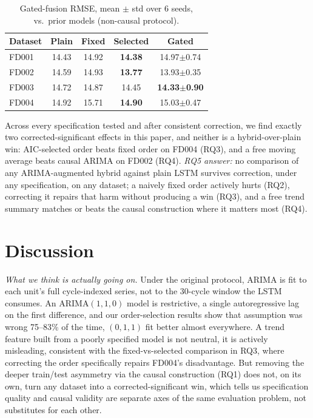 \documentclass[conference]{IEEEtran}
\begin{document}
\begin{table}[t]
\centering
\caption{Gated-fusion RMSE, mean $\pm$ std over 6 seeds, vs.\ prior models (non-causal protocol).}
\label{tab:gated}
\footnotesize
\begin{tabular}{lcccc}
\toprule
Dataset & Plain & Fixed & Selected & Gated \\
\midrule
FD001 & 14.43 & 14.92 & \textbf{14.38} & 14.97{\tiny$\pm$0.74} \\
FD002 & 14.59 & 14.93 & \textbf{13.77} & 13.93{\tiny$\pm$0.35} \\
FD003 & 14.72 & 14.87 & 14.45 & \textbf{14.33{\tiny$\pm$0.90}} \\
FD004 & 14.92 & 15.71 & \textbf{14.90} & 15.03{\tiny$\pm$0.47} \\
\bottomrule
\end{tabular}
\end{table}

Across every specification tested and after consistent correction, we find exactly two corrected-significant effects in this paper, and neither is a hybrid-over-plain win: AIC-selected order beats fixed order on FD004 (RQ3), and a free moving average beats causal ARIMA on FD002 (RQ4). \emph{RQ5 answer:} no comparison of any ARIMA-augmented hybrid against plain LSTM survives correction, under any specification, on any dataset; a naively fixed order actively hurts (RQ2), correcting it repairs that harm without producing a win (RQ3), and a free trend summary matches or beats the causal construction where it matters most (RQ4).

\section{Discussion}
\emph{What we think is actually going on.} Under the original protocol, ARIMA is fit to each unit's full cycle-indexed series, not to the 30-cycle window the LSTM consumes. An ARIMA$(1,1,0)$ model is restrictive, a single autoregressive lag on the first difference, and our order-selection results show that assumption was wrong 75--83\% of the time, $(0,1,1)$ fit better almost everywhere. A trend feature built from a poorly specified model is not neutral, it is actively misleading, consistent with the fixed-vs-selected comparison in RQ3, where correcting the order specifically repairs FD004's disadvantage. But removing the deeper train/test asymmetry via the causal construction (RQ1) does not, on its own, turn any dataset into a corrected-significant win, which tells us specification quality and causal validity are separate axes of the same evaluation problem, not substitutes for each other.
\end{document}

